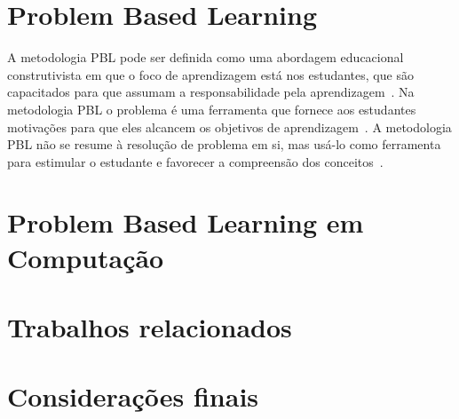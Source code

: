 \acresetall
\section{Problem Based Learning}
A metodologia PBL pode ser definida como uma abordagem educacional
construtivista em que o foco de aprendizagem está nos estudantes,
que são capacitados para que assumam a responsabilidade pela
aprendizagem~\cite{dolmans2005problem}.
Na metodologia PBL o problema é uma ferramenta que fornece
aos estudantes motivações para que eles alcancem os
objetivos de aprendizagem~\cite{wood2003problem, o2012practical}.
A metodologia PBL não se resume à resolução de problema em si, mas usá-lo como
ferramenta para estimular o estudante e favorecer a compreensão dos
conceitos~\cite{wood2003problem}.
\section{Problem Based Learning em Computação}
\section{Trabalhos relacionados}
\section{Considerações finais}
